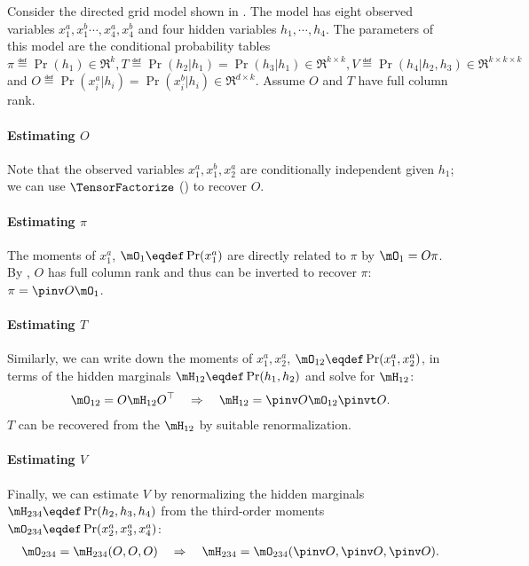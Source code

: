 Consider the directed grid model shown in .
The model has eight observed variables $x^a_1, x^b_1 \cdots, x^a_4, x^b_4$ and four
  hidden variables $h_1, \cdots, h_4$.
The parameters of this model are the conditional probability tables
$\pi \eqdef \Pr(h_1) \in \Re^k, T \eqdef \Pr(h_2 | h_1) = \Pr(h_3 | h_1) \in \Re^{k \times k},
V \eqdef \Pr(h_4 | h_2, h_3) \in \Re^{k \times k \times k}$ and $O \eqdef \Pr(x^a_i | h_i)
=  \Pr(x^b_i | h_i) \in \Re^{d \times k}$. 
Assume $O$ and $T$ have full column rank.

\paragraph{Estimating $O$}
Note that the observed variables $x^a_1, x^b_1, x^a_2$ are
  conditionally independent given $h_1$; we can use
  $\TensorFactorize$ () to recover $O$.

\paragraph{Estimating $\pi$}
The moments of $x^a_1$, $\mO_1 \eqdef \Pr(x^a_1)$ are directly related to
  $\pi$ by $\mO_1 = O \pi$. 
By , $O$ has full column rank and thus can be
  inverted to recover $\pi$: $\pi = \pinv O \mO_1$.

\paragraph{Estimating $T$}
Similarly, we can write down the moments of $x^a_1, x^a_2$, $\mO_{12}
  \eqdef \Pr(x^a_1, x^a_2)$, in terms of the hidden marginals $\mH_{12}
  \eqdef \Pr(h_1, h_2)$ and solve for $\mH_{12}$:
\begin{align*}
\mO_{12} = O \mH_{12} O^\top \quad\Rightarrow\quad
  \mH_{12} = \pinv O \mO_{12} \pinvt O.
\end{align*}
$T$ can be recovered from the $\mH_{12}$ by suitable renormalization.

\paragraph{Estimating $V$}
Finally, we can estimate $V$ by renormalizing the hidden marginals
$\mH_{234} \eqdef \Pr(h_2, h_3, h_4)$ from the third-order moments
$\mO_{234} \eqdef \Pr(x^a_2, x^a_3, x^a_4)$:
\begin{align*}
  \mO_{234} = \mH_{234}(O, O, O) \quad\Rightarrow\quad
  \mH_{234} = \mO_{234}(\pinv O, \pinv O, \pinv O).
\end{align*}

